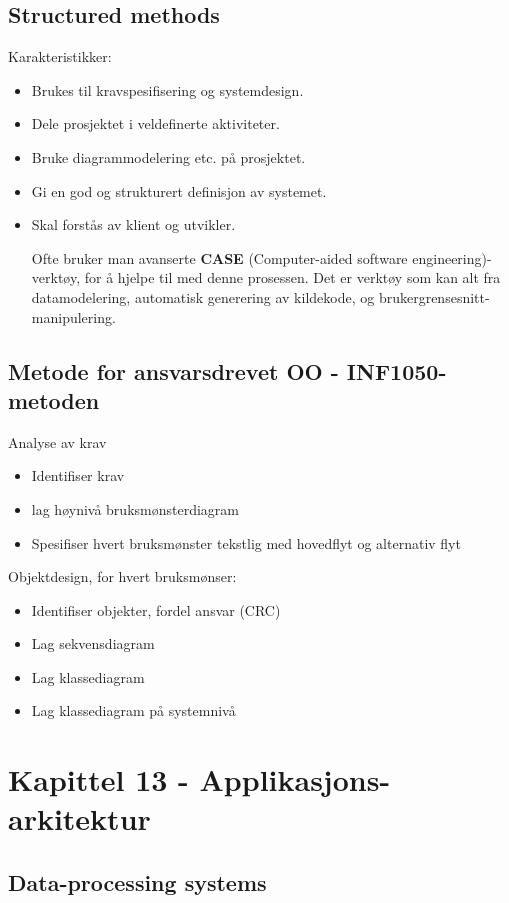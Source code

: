 \documentclass[11pt]{article}
\begin{document}
\subsection{Structured methods}
\label{sec-7.5}

   Karakteristikker:

\begin{itemize}
\item Brukes til kravspesifisering og systemdesign.
\item Dele prosjektet i veldefinerte aktiviteter.
\item Bruke diagrammodelering etc. på prosjektet.
\item Gi en god og strukturert definisjon av systemet.
\item Skal forstås av klient og utvikler.

    Ofte bruker man avanserte \textbf{CASE} (Computer-aided software engineering)-verktøy, 
    for å hjelpe til med denne prosessen. Det er verktøy som kan alt fra datamodelering, 
    automatisk generering av kildekode, og brukergrensesnitt-manipulering.
\end{itemize}
\subsection{Metode for ansvarsdrevet OO - INF1050-metoden}
\label{sec-7.6}

   Analyse av krav
\begin{itemize}
\item Identifiser krav
\item lag høynivå bruksmønsterdiagram
\item Spesifiser hvert bruksmønster tekstlig med hovedflyt og alternativ flyt
\end{itemize}

   Objektdesign, for hvert bruksmønser:
\begin{itemize}
\item Identifiser objekter, fordel ansvar (CRC)
\item Lag sekvensdiagram
\item Lag klassediagram
\item Lag klassediagram på systemnivå
\end{itemize}
\section{Kapittel 13 - Applikasjons-arkitektur}
\label{sec-8}
\subsection{Data-processing systems}
\label{sec-8.1}
\end{document}
